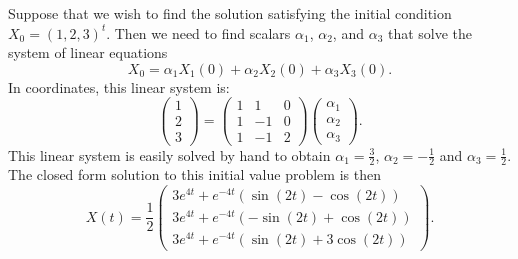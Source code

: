 \documentclass{ximera}
\begin{document}
Suppose that we wish to find the solution satisfying the initial 
condition $X_0=(1,2,3)^t$.  Then we need 
to find scalars $\alpha_1$,
$\alpha_2$, and $\alpha_3$ that solve the system of linear equations
\[
X_0 = \alpha_1X_1(0) + \alpha_2X_2(0) + \alpha_3X_3(0).
\]
In coordinates, this linear system is:
\[
\left(\begin{array}{c} 1 \\ 2 \\ 3\end{array}\right) =
\left(\begin{array}{rrr} 1 & 1 & 0 \\ 1 & -1 & 0 \\ 1 & -1 & 2 \end{array}
\right)\left(\begin{array}{c} \alpha_1 \\ \alpha_2 \\ \alpha_3
\end{array}\right).
\] 
This linear system is easily solved by hand to obtain 
$\alpha_1=\frac{3}{2}$, $\alpha_2=-\frac{1}{2}$ and $\alpha_3=\frac{1}{2}$.
The closed form solution to this initial value problem is then 
\begin{equation}  \label{E:ecp}
X(t) = \frac{1}{2}\left(\begin{array}{c} 
3e^{4t} + e^{-4t}(\sin(2t)-\cos(2t)) \\
3e^{4t} + e^{-4t}(-\sin(2t)+\cos(2t))\\
3e^{4t} + e^{-4t}(\sin(2t)+3\cos(2t))
\end{array}\right).
\end{equation}
\end{document}
